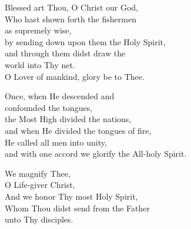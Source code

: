 \documentclass{article}
\begin{document}
%
Blessed art Thou, O Christ our God, \\
Who hast shown forth the fishermen \\
    \cont as supremely wise, \\
by sending down upon them the Holy Spirit, \\
and through them didst draw the \\
    \cont world into Thy net. \\
O Lover of mankind, glory be to Thee.

Once, when He descended and \\
   \cont confounded the tongues, \\
the Most High divided the nations, \\
and when He divided the tongues of fire, \\
He called all men into unity, \\
and with one accord we glorify the All-holy Spirit.

We magnify Thee, \\
O Life-giver Christ, \\
And we honor Thy most Holy Spirit, \\
Whom Thou didst send from the Father\\
unto Thy disciples.

\vfill
\end{document}
